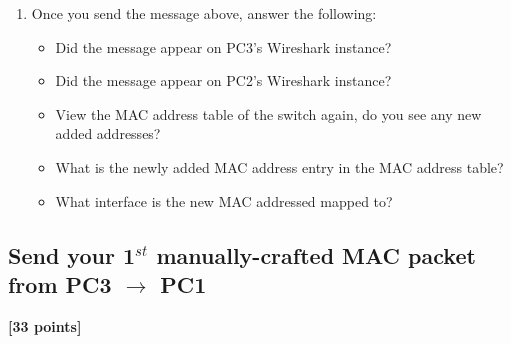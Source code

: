 \documentclass[pdftex,12pt,a4paper]{article}
\begin{document}
\begin{enumerate}
                \item Once you send the message above, answer the following:
                    \begin{itemize}
                        \item Did the message appear on PC3's Wireshark
                        instance?
                        \item Did the message appear on PC2's Wireshark
                        instance?
                        \item View the MAC address table of the switch again,
                        do you see any new added addresses? 
                        \item What is the newly added MAC address entry in the
                        MAC address table?
                        \item What interface is the new MAC addressed mapped
                        to?
                    \end{itemize}
            \end{enumerate}

        \subsection{Send your 1$^{st}$ manually-crafted MAC packet from PC3
        $\longrightarrow$ PC1}\label{sec:3to1}
            \begin{flushright}
                \textbf{[33 points]}
            \end{flushright}
\end{document}
